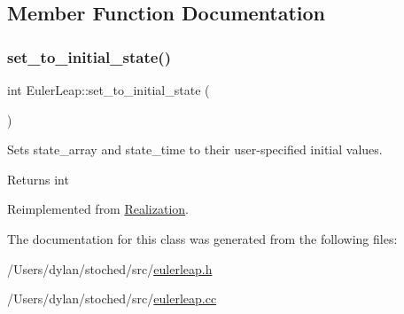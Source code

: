 \subsection{Member Function Documentation}
\mbox{\label{class_euler_leap_a1a13929ea1ebf40e7357439968828f4b}} 
\subsubsection{\texorpdfstring{set\+\_\+to\+\_\+initial\+\_\+state()}{set\_to\_initial\_state()}}
{\footnotesize\ttfamily int Euler\+Leap\+::set\+\_\+to\+\_\+initial\+\_\+state (\begin{DoxyParamCaption}{ }\end{DoxyParamCaption})\hspace{0.3cm}{\ttfamily [virtual]}}



Sets state\+\_\+array and state\+\_\+time to their user-\/specified initial values. 

\begin{DoxyReturn}{Returns}
int 
\end{DoxyReturn}


Reimplemented from \hyperlink{class_realization_a391a89af7574a9053f53f8a299c2cc70}{Realization}.



The documentation for this class was generated from the following files\+:\begin{DoxyCompactItemize}
\item 
/\+Users/dylan/stoched/src/\hyperlink{eulerleap_8h}{eulerleap.\+h}\item 
/\+Users/dylan/stoched/src/\hyperlink{eulerleap_8cc}{eulerleap.\+cc}\end{DoxyCompactItemize}
